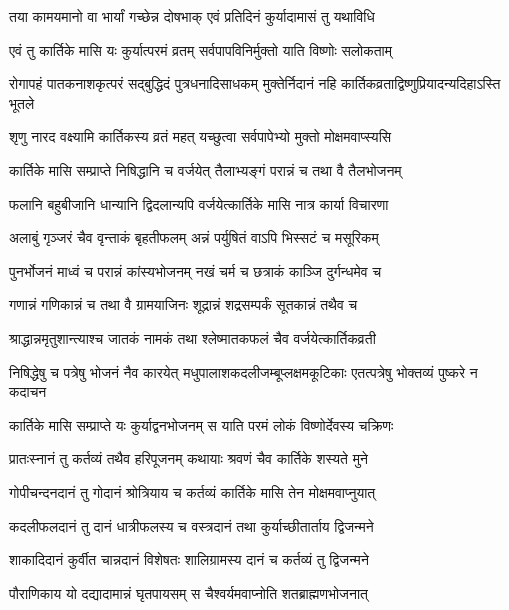 \twolineshloka
{तया कामयमानो वा भार्यां गच्छेन्न दोषभाक्}
{एवं प्रतिदिनं कुर्यादामासं तु यथाविधि} %

\twolineshloka
{एवं तु कार्तिके मासि यः कुर्यात्परमं व्रतम्}
{सर्वपापविनिर्मुक्तो याति विष्णोः सलोकताम्} %

\twolineshloka
{रोगापहं पातकनाशकृत्परं सद्बुद्धिदं पुत्रधनादिसाधकम्}
{मुक्तेर्निदानं नहि कार्तिकव्रताद्विष्णुप्रियादन्यदिहाऽस्ति भूतले} %





\twolineshloka
{शृणु नारद वक्ष्यामि कार्तिकस्य व्रतं महत्}
{यच्छुत्वा सर्वपापेभ्यो मुक्तो मोक्षमवाप्स्यसि} %

\twolineshloka
{कार्तिके मासि सम्प्राप्ते निषिद्धानि च वर्जयेत्}
{तैलाभ्यङ्गं परान्नं च तथा वै तैलभोजनम्} %

\twolineshloka
{फलानि बहुबीजानि धान्यानि द्विदलान्यपि}
{वर्जयेत्कार्तिके मासि नात्र कार्या विचारणा} %

\twolineshloka
{अलाबुं गृञ्जरं चैव वृन्ताकं बृहतीफलम्}
{अन्नं पर्युषितं वाऽपि भिस्सटं च मसूरिकम्} %

\twolineshloka
{पुनर्भोजनं माध्वं च परान्नं कांस्यभोजनम्}
{नखं चर्म च छत्राकं काञ्जि दुर्गन्धमेव च} %

\twolineshloka
{गणान्नं गणिकान्नं च तथा वै ग्रामयाजिनः}
{शूद्रान्नं शद्रसम्पर्कं सूतकान्नं तथैव च} %

\twolineshloka
{श्राद्धान्नमृतुशान्त्याश्च जातकं नामकं तथा}
{श्लेष्मातकफलं चैव वर्जयेत्कार्तिकव्रती} %

\threelineshloka
{निषिद्धेषु च पत्रेषु भोजनं नैव कारयेत्}
{मधुपालाशकदलीजम्बूप्लक्षमकूटिकाः}
{एतत्पत्रेषु भोक्तव्यं पुष्करे न कदाचन} %

\twolineshloka
{कार्तिके मासि सम्प्राप्ते यः कुर्याद्वनभोजनम्}
{स याति परमं लोकं विष्णोर्देवस्य चक्रिणः} %

\twolineshloka
{प्रातःस्नानं तु कर्तव्यं तथैव हरिपूजनम्}
{कथायाः श्रवणं चैव कार्तिके शस्यते मुने} %

\twolineshloka
{गोपीचन्दनदानं तु गोदानं श्रोत्रियाय च}
{कर्तव्यं कार्तिके मासि तेन मोक्षमवाप्नुयात्} %

\twolineshloka
{कदलीफलदानं तु दानं धात्रीफलस्य च}
{वस्त्रदानं तथा कुर्याच्छीतार्ताय द्विजन्मने} %

\twolineshloka
{शाकादिदानं कुर्वीत चान्नदानं विशेषतः}
{शालिग्रामस्य दानं च कर्तव्यं तु द्विजन्मने} %

\twolineshloka
{पौराणिकाय यो दद्यादामान्नं घृतपायसम्}
{स चैश्वर्यमवाप्नोति शतब्राह्मणभोजनात्} %

